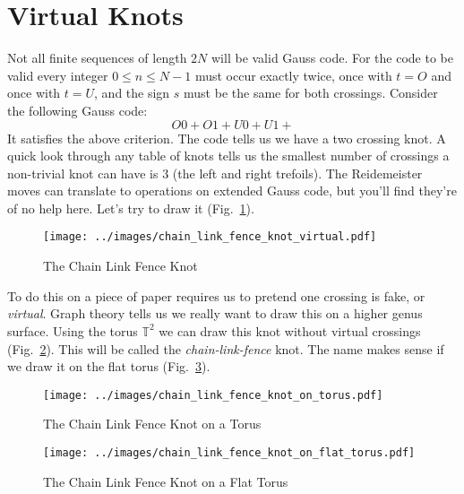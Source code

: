 \documentclass{article}
\theoremstyle{plain}
\begin{document}
    \section{Virtual Knots}
        Not all finite sequences of length $2N$ will be valid Gauss code. For
        the code to be valid every integer $0\leq{n}\leq{N-1}$ must occur
        exactly twice, once with $t=O$ and once with $t=U$, and the sign
        $s$ must be the same for both crossings. Consider the following Gauss
        code:
        \begin{equation}
            O0+O1+U0+U1+
        \end{equation}
        It satisfies the above criterion.
        The code tells us we have a two crossing knot. A quick look through any
        table of knots tells us the smallest number of crossings a non-trivial
        knot can have is 3 (the left and right trefoils). The
        Reidemeister moves can translate to operations on extended Gauss code,
        but you'll find they're of no help here. Let's try to draw it
        (Fig.~\ref{fig:chain_link_fence_knot}).
        \begin{figure}
            \centering
            \texttt{[image: ../images/chain\_link\_fence\_knot\_virtual.pdf]}
            \caption{The Chain Link Fence Knot}
            \label{fig:chain_link_fence_knot}
        \end{figure}
        To do this on a piece of paper requires us to pretend one crossing is
        fake, or \textit{virtual}. Graph theory tells us we really want to draw
        this on a higher genus surface. Using the torus $\mathbb{T}^{2}$ we can
        draw this knot without virtual crossings
        (Fig.~\ref{fig:chain_link_fence_knot_on_torus}). This will be called
        the \textit{chain-link-fence} knot. The name makes sense if we draw it
        on the flat torus (Fig.~\ref{fig:chain_link_fence_knot_on_flat_torus}).
        \begin{figure}
            \centering
            \texttt{[image: ../images/chain\_link\_fence\_knot\_on\_torus.pdf]}
            \caption{The Chain Link Fence Knot on a Torus}
            \label{fig:chain_link_fence_knot_on_torus}
        \end{figure}
        \begin{figure}
            \centering
            \texttt{[image: ../images/chain\_link\_fence\_knot\_on\_flat\_torus.pdf]}
            \caption{The Chain Link Fence Knot on a Flat Torus}
            \label{fig:chain_link_fence_knot_on_flat_torus}
        \end{figure}
\end{document}
